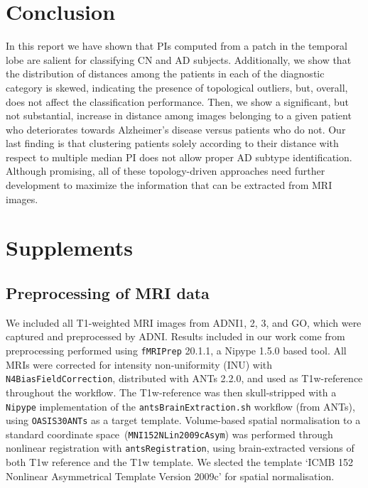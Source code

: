 \documentclass{article}
\begin{document}
\section{Conclusion}

In this report we have shown that PIs computed from a patch in the temporal lobe are salient for classifying CN and AD subjects. Additionally, we show that the distribution of distances among the patients in each of the diagnostic category is skewed, indicating the presence of topological outliers, but, overall, does not affect the classification performance. Then, we show a significant, but not substantial, increase in distance among images belonging to a given patient who deteriorates towards Alzheimer's disease versus patients who do not. Our last finding is that clustering patients solely according to their distance with respect to multiple median PI does not allow proper AD subtype identification. Although promising, all of these topology-driven approaches need further development to maximize the information that can be extracted from MRI images.

\clearpage



\clearpage
\appendix

\section{Supplements}
\subsection{Preprocessing of MRI data}\label{apd:preprocessing}
We included all T1-weighted MRI images from ADNI1, 2, 3, and GO, which were captured and preprocessed by ADNI.
Results included in our work come from preprocessing performed using \texttt{fMRIPrep} 20.1.1, a Nipype 1.5.0 based tool.
All MRIs were corrected for intensity non-uniformity (INU) with \texttt{N4BiasFieldCorrection}, distributed with ANTs 2.2.0, and used as T1w-reference throughout the workflow.
The T1w-reference was then skull-stripped with a \texttt{Nipype} implementation of
the \texttt{antsBrainExtraction.sh} workflow (from ANTs), using \texttt{OASIS30ANTs} as a target template.
Volume-based spatial normalisation to a standard coordinate space~(\texttt{MNI152NLin2009cAsym}) was performed through
nonlinear registration with \texttt{antsRegistration}, using brain-extracted versions of both T1w reference and the T1w template.
We slected the template `ICMB 152 Nonlinear Asymmetrical Template Version 2009c' for spatial normalisation.
\end{document}
